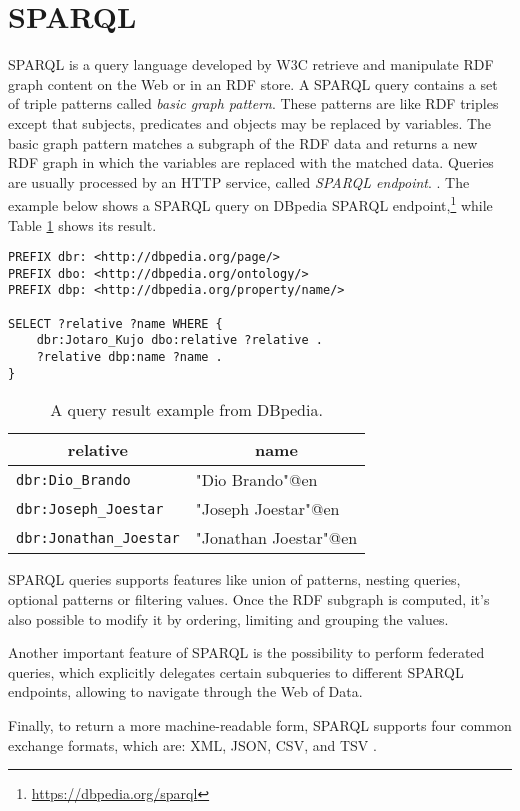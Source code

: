 \section{SPARQL}
\label{sec:sparql}

\ac{SPARQL} is a query language developed by \ac{W3C} retrieve and manipulate \ac{RDF} graph content on the Web or in an \ac{RDF} store. A \ac{SPARQL} query contains a set of triple patterns called \textit{basic graph pattern}. These patterns are like \ac{RDF} triples except that subjects, predicates and objects may be replaced by variables. The basic graph pattern matches a subgraph of the \ac{RDF} data and returns a new \ac{RDF} graph in which the variables are replaced with the matched data. Queries are usually processed by an \ac{HTTP} service, called \textit{\ac{SPARQL} endpoint}. \cite{world2013sparql}. The example below shows a \ac{SPARQL} query on DBpedia \ac{SPARQL} endpoint,\footnote{\url{https://dbpedia.org/sparql}} while Table \ref{tab:sparql-example} shows its result.

\begin{verbatim}
PREFIX dbr: <http://dbpedia.org/page/>
PREFIX dbo: <http://dbpedia.org/ontology/>
PREFIX dbp: <http://dbpedia.org/property/name/>

SELECT ?relative ?name WHERE {
    dbr:Jotaro_Kujo dbo:relative ?relative .
    ?relative dbp:name ?name .
}
\end{verbatim}

\begin{table}[!ht]
    \centering
    \begin{tabular}{|l|l|}
        \hline
        \multicolumn{1}{|c|}{\textbf{relative}} & \multicolumn{1}{c|}{\textbf{name}} \\ \hline
        \verb#dbr:Dio_Brando# & "Dio Brando"@en \\ \hline
        \verb#dbr:Joseph_Joestar# & "Joseph Joestar"@en \\ \hline
        \verb#dbr:Jonathan_Joestar# & "Jonathan Joestar"@en \\ \hline
    \end{tabular}
    \caption{A query result example from DBpedia.}
    \label{tab:sparql-example}
\end{table}

\ac{SPARQL} queries supports features like union of patterns, nesting queries, optional patterns or filtering values. Once the \ac{RDF} subgraph is computed, it's also possible to modify it by ordering, limiting and grouping the values.

Another important feature of \ac{SPARQL} is the possibility to perform federated queries, which explicitly delegates certain subqueries to different \ac{SPARQL} endpoints, allowing to navigate through the Web of Data.

Finally, to return a more machine-readable form, \ac{SPARQL} supports four common exchange formats, which are: \ac{XML}, \ac{JSON}, \ac{CSV}, and \ac{TSV} \cite{world2013sparql}.